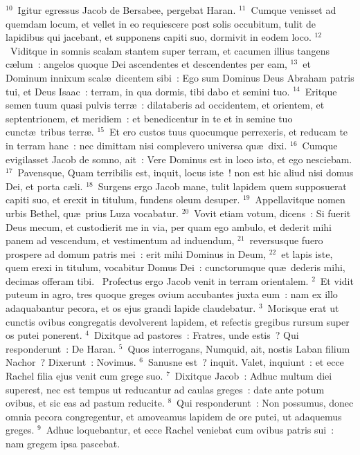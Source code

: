 ${}^{10}$~Igitur egressus Jacob de Bersabee, pergebat Haran.
${}^{11}$~Cumque venisset ad quemdam locum, et vellet in eo requiescere post solis occubitum, tulit de lapidibus qui jacebant, et supponens capiti suo, dormivit in eodem loco.
${}^{12}$~Viditque in somnis scalam stantem super terram, et cacumen illius tangens c\ae lum~: angelos quoque Dei ascendentes et descendentes per eam,
${}^{13}$~et Dominum innixum scal\ae\ dicentem sibi~: Ego sum Dominus Deus Abraham patris tui, et Deus Isaac~: terram, in qua dormis, tibi dabo et semini tuo.
${}^{14}$~Eritque semen tuum quasi pulvis terr\ae~: dilataberis ad occidentem, et orientem, et septentrionem, et meridiem~: et benedicentur in te et in semine tuo cunct\ae\ tribus terr\ae .
${}^{15}$~Et ero custos tuus quocumque perrexeris, et reducam te in terram hanc~: nec dimittam nisi complevero universa qu\ae\ dixi.
${}^{16}$~Cumque evigilasset Jacob de somno, ait~: Vere Dominus est in loco isto, et ego nesciebam.
${}^{17}$~Pavensque, Quam terribilis est, inquit, locus iste~! non est hic aliud nisi domus Dei, et porta c\ae li.
${}^{18}$~Surgens ergo Jacob mane, tulit lapidem quem supposuerat capiti suo, et erexit in titulum, fundens oleum desuper.
${}^{19}$~Appellavitque nomen urbis Bethel, qu\ae\ prius Luza vocabatur.
${}^{20}$~Vovit etiam votum, dicens~: Si fuerit Deus mecum, et custodierit me in via, per quam ego ambulo, et dederit mihi panem ad vescendum, et vestimentum ad induendum,
${}^{21}$~reversusque fuero prospere ad domum patris mei~: erit mihi Dominus in Deum,
${}^{22}$~et lapis iste, quem erexi in titulum, vocabitur Domus Dei~: cunctorumque qu\ae\ dederis mihi, decimas offeram tibi.
~Profectus ergo Jacob venit in terram orientalem.
${}^{2}$~Et vidit puteum in agro, tres quoque greges ovium accubantes juxta eum~: nam ex illo adaquabantur pecora, et os ejus grandi lapide claudebatur.
${}^{3}$~Morisque erat ut cunctis ovibus congregatis devolverent lapidem, et refectis gregibus rursum super os putei ponerent.
${}^{4}$~Dixitque ad pastores~: Fratres, unde estis~? Qui responderunt~: De Haran.
${}^{5}$~Quos interrogans, Numquid, ait, nostis Laban filium Nachor~? Dixerunt~: Novimus.
${}^{6}$~Sanusne est~? inquit. Valet, inquiunt~: et ecce Rachel filia ejus venit cum grege suo.
${}^{7}$~Dixitque Jacob~: Adhuc multum diei superest, nec est tempus ut reducantur ad caulas greges~: date ante potum ovibus, et sic eas ad pastum reducite.
${}^{8}$~Qui responderunt~: Non possumus, donec omnia pecora congregentur, et amoveamus lapidem de ore putei, ut adaquemus greges.
${}^{9}$~Adhuc loquebantur, et ecce Rachel veniebat cum ovibus patris sui~: nam gregem ipsa pascebat.
